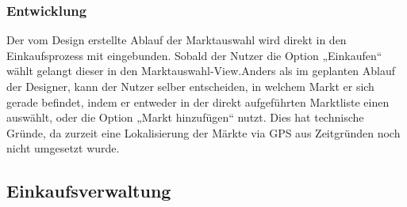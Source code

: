 \documentclass[12pt,a4paper]{article}
\begin{document}
\subsubsection*{Entwicklung}
Der vom Design erstellte Ablauf der Marktauswahl wird direkt in den Einkaufsprozess mit eingebunden. Sobald der Nutzer die Option „Einkaufen“ wählt gelangt dieser in den Marktauswahl-View.Anders als im geplanten Ablauf der Designer, kann der Nutzer selber entscheiden, in welchem Markt er sich gerade befindet, indem er entweder in der direkt aufgeführten Marktliste einen auswählt, oder die Option „Markt hinzufügen“ nutzt. Dies hat technische Gründe, da zurzeit eine Lokalisierung der Märkte via GPS aus Zeitgründen noch nicht umgesetzt wurde.
\newpage
\subsection{Einkaufsverwaltung}
\end{document}
